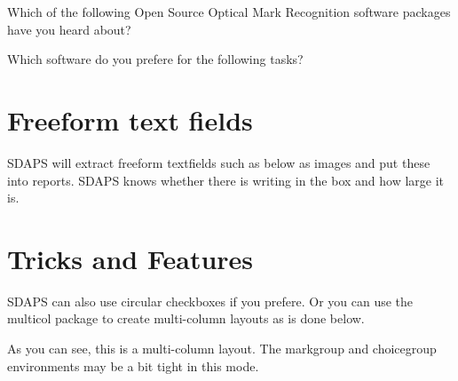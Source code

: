 \documentclass[
  english,
  pagemark,
  stamp]{sdapsclassic}
\begin{document}
\begin{questionnaire}
\begin{choicequestion}[cols=3]{Which of the following Open Source
                                   Optical Mark Recognition software
                                   packages have you heard about?}
    \end{choicequestion}

    \begin{choicegroup}{Which software do you prefere for the following tasks?}
      \groupaddchoice{\LaTeX}

    \end{choicegroup}

    \section{Freeform text fields}

    SDAPS will extract freeform textfields such as below as images and put
    these into reports. SDAPS knows whether there is writing in the box and
    how large it is.


    \newpage
    \section{Tricks and Features}
    SDAPS can also use circular checkboxes if you prefere. Or you can use the
    {\ttfamily multicol} package to create multi-column layouts as is done below.

    \def\checkboxstyle{ellipse}

    \begin{multicols}{2}
      \label{somelabel}

      As you can see, this is a multi-column layout. The {\ttfamily markgroup} and
      {\ttfamily choicegroup} environments may be a bit tight in this mode.


\end{multicols}
\end{questionnaire}
\end{document}
